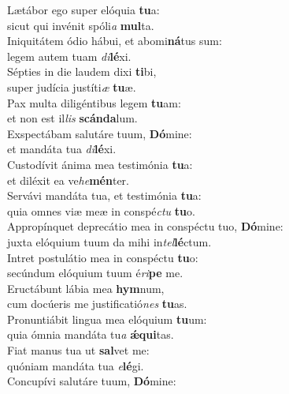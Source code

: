 \evenverse Lætábor ego super elóquia \textbf{tu}a:~\*\\
\evenverse sicut qui invénit spóli\textit{a} \textbf{mul}ta.\\
\oddverse Iniquitátem ódio hábui, et abomi\textbf{ná}tus sum:~\*\\
\oddverse legem autem tuam \textit{di}\textbf{lé}xi.\\
\evenverse Sépties in die laudem dixi \textbf{ti}bi,~\*\\
\evenverse super judícia justíti\textit{æ} \textbf{tu}æ.\\
\oddverse Pax multa diligéntibus legem \textbf{tu}am:~\*\\
\oddverse et non est il\textit{lis} \textbf{scán}\textbf{da}lum.\\
\evenverse Exspectábam salutáre tuum, \textbf{Dó}mine:~\*\\
\evenverse et mandáta tua \textit{di}\textbf{lé}xi.\\
\oddverse Custodívit ánima mea testimónia \textbf{tu}a:~\*\\
\oddverse et diléxit ea ve\textit{he}\textbf{mén}ter.\\
\evenverse Servávi mandáta tua, et testimónia \textbf{tu}a:~\*\\
\evenverse quia omnes viæ meæ in conspé\textit{ctu} \textbf{tu}o.\\
\oddverse Appropínquet deprecátio mea in conspéctu tuo, \textbf{Dó}mine:~\*\\
\oddverse juxta elóquium tuum da mihi in\textit{tel}\textbf{lé}ctum.\\
\evenverse Intret postulátio mea in conspéctu \textbf{tu}o:~\*\\
\evenverse secúndum elóquium tuum é\textit{ri}\textbf{pe} me.\\
\oddverse Eructábunt lábia mea \textbf{hym}num,~\*\\
\oddverse cum docúeris me justificatió\textit{nes} \textbf{tu}as.\\
\evenverse Pronuntiábit lingua mea elóquium \textbf{tu}um:~\*\\
\evenverse quia ómnia mandáta tu\textit{a} \textbf{ǽ}\textbf{qui}tas.\\
\oddverse Fiat manus tua ut \textbf{sal}vet me:~\*\\
\oddverse quóniam mandáta tua \textit{e}\textbf{lé}gi.\\
\evenverse Concupívi salutáre tuum, \textbf{Dó}mine:~\*\\
